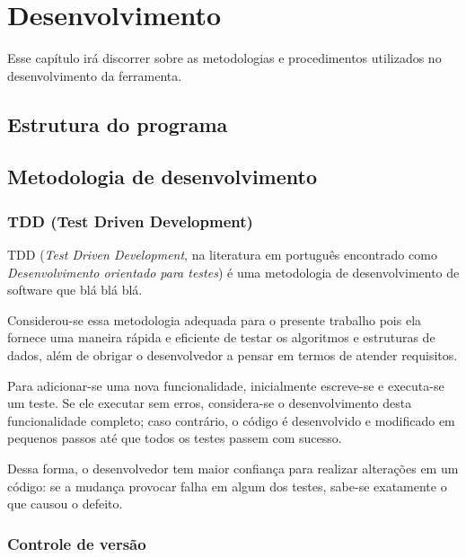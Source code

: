 \chapter{Desenvolvimento}

Esse capítulo irá discorrer sobre as metodologias e procedimentos utilizados no desenvolvimento da ferramenta.

\section{Estrutura do programa}
\section{Metodologia de desenvolvimento}
\subsection{TDD (Test Driven Development)}

TDD (\textit{Test Driven Development}, na literatura em português encontrado como \textit{Desenvolvimento orientado para testes}) é uma metodologia de desenvolvimento de software que blá blá blá.

Considerou-se essa metodologia adequada para o presente trabalho pois ela fornece uma maneira rápida e eficiente de testar os algoritmos e estruturas de dados, além de obrigar o desenvolvedor a pensar em termos de atender requisitos.

Para adicionar-se uma nova funcionalidade, inicialmente escreve-se e executa-se um teste. Se ele executar sem erros, considera-se o desenvolvimento desta funcionalidade completo; caso contrário, o código é desenvolvido e modificado em pequenos passos até que todos os testes passem com sucesso.

Dessa forma, o desenvolvedor tem maior confiança para realizar alterações em um código: se a mudança provocar falha em algum dos testes, sabe-se exatamente o que causou o defeito.

\subsection{Controle de versão}
